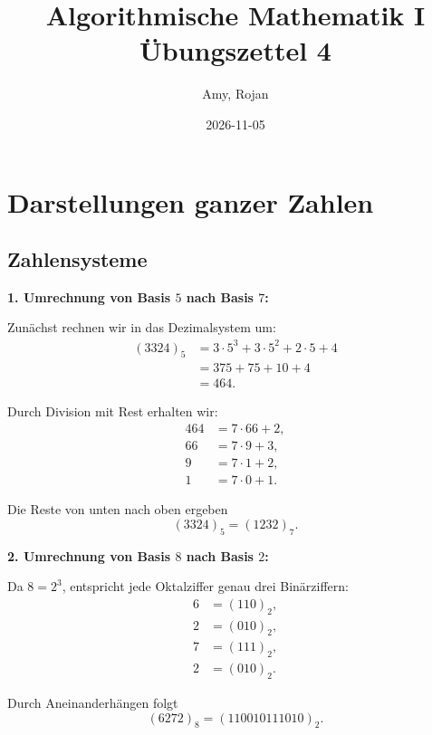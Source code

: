 \documentclass{report}
\title{\huge{Algorithmische Mathematik I \\ Übungszettel 4}}
\author{\huge{Amy, Rojan}}
\date{2026-11-05}
\begin{document}
\maketitle
\tableofcontents

\chapter{Darstellungen ganzer Zahlen}


\section{Zahlensysteme}


\begin{myproof}
  \textbf{1. Umrechnung von Basis $5$ nach Basis $7$:}

  Zunächst rechnen wir in das Dezimalsystem um:
  \begin{align*}
    (3324)_5
    &=3\cdot5^3+3\cdot5^2+2\cdot5+4\\
    &=375+75+10+4\\
    &=464.
  \end{align*}

  Durch Division mit Rest erhalten wir:
  \begin{align*}
    464&=7\cdot66+2,\\
    66&=7\cdot9+3,\\
    9&=7\cdot1+2,\\
    1&=7\cdot0+1.
  \end{align*}

  Die Reste von unten nach oben ergeben
  \[
    \boxed{(3324)_5=(1232)_7.}
  \]

  \medskip
  \textbf{2. Umrechnung von Basis $8$ nach Basis $2$:}

  Da $8=2^3$, entspricht jede Oktalziffer
  genau drei Binärziffern:
  \begin{align*}
    6&=(110)_2,\\
    2&=(010)_2,\\
    7&=(111)_2,\\
    2&=(010)_2.
  \end{align*}

  Durch Aneinanderhängen folgt
  \[
    \boxed{(6272)_8=(110010111010)_2.}
  \]
\end{myproof}
\end{document}
